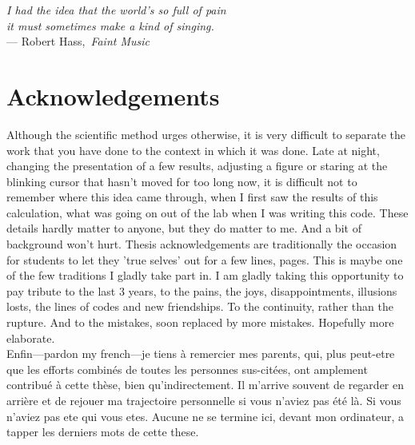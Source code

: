 

\begin{flushright}{\slshape    
    I had the idea that the world's so full of pain \\
    it must sometimes make a kind of singing.} \\\medskip
    --- Robert Hass,\, \emph{Faint Music}
\end{flushright}

\begingroup

\let\clearpage\relax
\let\cleardoublepage\relax
\let\cleardoublepage\relax

\chapter*{Acknowledgements} %


Although the scientific method urges otherwise, it is very difficult to separate
the work that you have done to the context in which it was done. Late at night,
changing the presentation of a few results, adjusting a figure or staring at the
blinking cursor that hasn't moved for too long now, it is difficult not to
remember where this idea came through, when I first saw the results of this
calculation, what was going on out of the lab when I was writing this code.
These details hardly matter to anyone, but they do matter to me. And a bit of
background won't hurt. Thesis acknowledgements are traditionally the occasion
for students to let they 'true selves' out for a few lines, pages. This is maybe
one of the few traditions I gladly take part in. I am gladly
taking this opportunity to pay tribute to the last $3$ years, to the pains, the
joys, disappointments, illusions losts, the lines of codes and new friendships.
To the continuity, rather than the rupture. And to the mistakes, soon replaced
by more mistakes.  Hopefully more elaborate.\\



Enfin---pardon my french---je tiens \`{a} remercier mes parents, qui, plus
peut-etre que les efforts combin\'es de toutes les personnes sus-cit\'ees, ont
amplement contribué à cette thèse, bien qu'indirectement. Il m'arrive souvent de
regarder en arrière et de rejouer ma trajectoire personnelle si vous n'aviez pas
été là. Si vous n'aviez pas ete qui vous etes. Aucune ne se termine ici, devant
mon ordinateur, a tapper les derniers mots de cette these.

